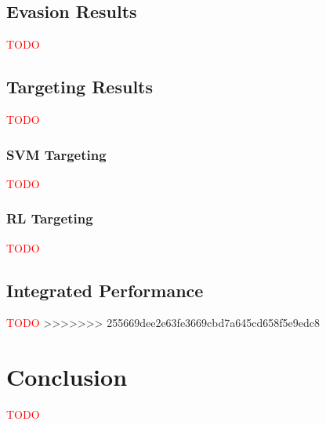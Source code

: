 \documentclass{article}
\newcommand{\xxx}[1]{\textcolor{red}{#1}}
\theoremstyle{plain}
\theoremstyle{definition}
\theoremstyle{remark}
\begin{document}
\subsection*{Evasion Results}
\xxx{TODO}

\subsection*{Targeting Results}
\xxx{TODO}

\subsubsection*{SVM Targeting}
\xxx{TODO}

\subsubsection*{RL Targeting}
\xxx{TODO}

\subsection*{Integrated Performance}
\xxx{TODO}
>>>>>>> 255669dee2e63fe3669cbd7a645cd658f5e9edc8

\section{Conclusion}

\xxx{TODO}




\end{document}
